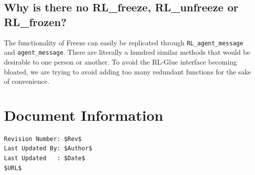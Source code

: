 \documentclass[11pt]{article}
\begin{document}
\subsection{Why is there no RL\_freeze, RL\_unfreeze or RL\_frozen?}
The functionality of Freeze can easily be replicated through \texttt{RL\_agent\_message} and \texttt{agent\_message}.  There are literally a hundred similar methods that would 
be desirable to one person or another. To avoid the RL-Glue interface becoming bloated, we are trying to avoid adding too many redundant functions for the sake of convenience.


\section*{Document Information}
\begin{verbatim}
Revision Number: $Rev$
Last Updated By: $Author$
Last Updated   : $Date$
$URL$
\end{verbatim}
\end{document}
